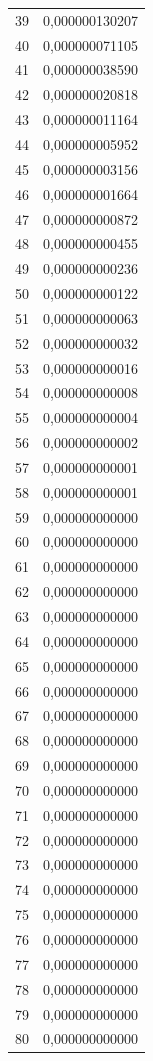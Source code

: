 \begin{tabular}{lr}
39 & 0,000000130207 \\
40 & 0,000000071105 \\
41 & 0,000000038590 \\
42 & 0,000000020818 \\
43 & 0,000000011164 \\
44 & 0,000000005952 \\
45 & 0,000000003156 \\
46 & 0,000000001664 \\
47 & 0,000000000872 \\
48 & 0,000000000455 \\
49 & 0,000000000236 \\
50 & 0,000000000122 \\
51 & 0,000000000063 \\
52 & 0,000000000032 \\
53 & 0,000000000016 \\
54 & 0,000000000008 \\
55 & 0,000000000004 \\
56 & 0,000000000002 \\
57 & 0,000000000001 \\
58 & 0,000000000001 \\
59 & 0,000000000000 \\
60 & 0,000000000000 \\
61 & 0,000000000000 \\
62 & 0,000000000000 \\
63 & 0,000000000000 \\
64 & 0,000000000000 \\
65 & 0,000000000000 \\
66 & 0,000000000000 \\
67 & 0,000000000000 \\
68 & 0,000000000000 \\
69 & 0,000000000000 \\
70 & 0,000000000000 \\
71 & 0,000000000000 \\
72 & 0,000000000000 \\
73 & 0,000000000000 \\
74 & 0,000000000000 \\
75 & 0,000000000000 \\
76 & 0,000000000000 \\
77 & 0,000000000000 \\
78 & 0,000000000000 \\
79 & 0,000000000000 \\
80 & 0,000000000000 \\

\end{tabular}

